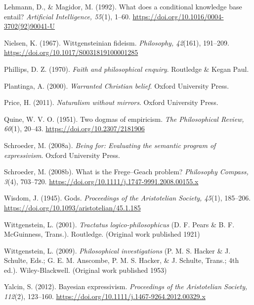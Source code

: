 \documentclass[
  11pt,
]{article}
\begin{document}
Lehmann, D., \& Magidor, M. (1992). What does a conditional knowledge
base entail? \emph{Artificial Intelligence, 55}(1), 1--60.
\url{https://doi.org/10.1016/0004-3702(92)90041-U}

Nielsen, K. (1967). Wittgensteinian fideism. \emph{Philosophy, 42}(161),
191--209. \url{https://doi.org/10.1017/S0031819100001285}

Phillips, D. Z. (1970). \emph{Faith and philosophical enquiry}.
Routledge \& Kegan Paul.

Plantinga, A. (2000). \emph{Warranted Christian belief}. Oxford
University Press.

Price, H. (2011). \emph{Naturalism without mirrors}. Oxford University
Press.

Quine, W. V. O. (1951). Two dogmas of empiricism. \emph{The
Philosophical Review, 60}(1), 20--43.
\url{https://doi.org/10.2307/2181906}

Schroeder, M. (2008a). \emph{Being for: Evaluating the semantic program
of expressivism}. Oxford University Press.

Schroeder, M. (2008b). What is the Frege--Geach problem?
\emph{Philosophy Compass, 3}(4), 703--720.
\url{https://doi.org/10.1111/j.1747-9991.2008.00155.x}

Wisdom, J. (1945). Gods. \emph{Proceedings of the Aristotelian Society,
45}(1), 185--206. \url{https://doi.org/10.1093/aristotelian/45.1.185}

Wittgenstein, L. (2001). \emph{Tractatus logico-philosophicus} (D. F.
Pears \& B. F. McGuinness, Trans.). Routledge. (Original work published
1921)

Wittgenstein, L. (2009). \emph{Philosophical investigations} (P. M. S.
Hacker \& J. Schulte, Eds.; G. E. M. Anscombe, P. M. S. Hacker, \& J.
Schulte, Trans.; 4th ed.). Wiley-Blackwell. (Original work published
1953)

Yalcin, S. (2012). Bayesian expressivism. \emph{Proceedings of the
Aristotelian Society, 112}(2), 123--160.
\url{https://doi.org/10.1111/j.1467-9264.2012.00329.x}
\end{document}
